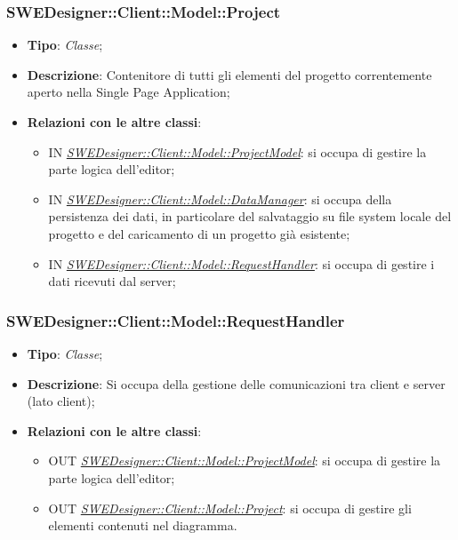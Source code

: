 \documentclass[../SpecificaTecnica.tex]{subfiles}
\begin{document}
				\subsubsection{SWEDesigner::Client::Model::Project}
				\hypertarget{SWEDesigner::Client::Model::Project}{}
					\begin{itemize}
						\item \textbf{Tipo}: \emph{Classe};
						\item \textbf{Descrizione}: Contenitore di tutti gli elementi del progetto correntemente aperto nella Single Page Application;
						\item \textbf{Relazioni con le altre classi}:
						\begin{itemize}
							\item IN \hyperlink{SWEDesigner::Client::Model::ProjectModel}{\emph{SWEDesigner::Client::Model::ProjectModel}}: si occupa di gestire la parte logica dell'editor;
							\item IN \hyperlink{SWEDesigner::Client::Model::DataManager}{\emph{SWEDesigner::Client::Model::DataManager}}: si occupa della persistenza dei dati, in particolare del salvataggio su file system locale del progetto e del caricamento di un progetto già esistente;
							\item IN \hyperlink{SWEDesigner::Client::Model::RequestHandler}{\emph{SWEDesigner::Client::Model::RequestHandler}}: si occupa di gestire i dati ricevuti dal server;
						\end{itemize}
					\end{itemize}
				
				\subsubsection{SWEDesigner::Client::Model::RequestHandler}
				\hypertarget{SWEDesigner::Client::Model::RequestHandler}{}
					\begin{itemize}
						\item \textbf{Tipo}: \emph{Classe};
						\item \textbf{Descrizione}: Si occupa della gestione delle comunicazioni tra client e server (lato client);
						\item \textbf{Relazioni con le altre classi}:
						\begin{itemize}
							\item OUT \hyperlink{SWEDesigner::Client::Model::ProjectModel}{\emph{SWEDesigner::Client::Model::ProjectModel}}: si occupa di gestire la parte logica dell'editor;
							\item OUT \hyperlink{SWEDesigner::Client::Model::Project}{\emph{SWEDesigner::Client::Model::Project}}: si occupa di gestire gli elementi contenuti nel diagramma.
						\end{itemize}
					\end{itemize}
\end{document}

